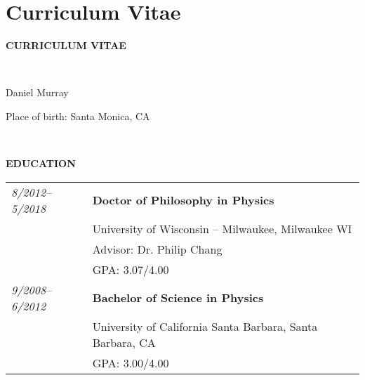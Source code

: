 \documentclass[12pt,notitlepage]{report}
\newcommand{\sglspc}{\setstretch{1.1}}
\begin{document}






%







\newpage
\section{Curriculum Vitae}
\sglspc
\begin{center}
{\bf \Large{CURRICULUM VITAE}}\\
\end{center}

\

Daniel Murray

Place of birth: Santa Monica, CA

\

\small{
\medskip\noindent
{\bfseries  EDUCATION}
\medskip

\begin{tabular}{ll}
{\it 8/2012--5/2018} & {\bf Doctor of Philosophy in Physics} \\
 			        & University of Wisconsin -- Milwaukee, Milwaukee WI \\
			        & Advisor: Dr. Philip Chang \\
			        & GPA: 3.07/4.00 \\
{\it 9/2008--6/2012} & {\bf Bachelor of Science in Physics} \\
 			        & University of California Santa Barbara, Santa Barbara, CA \\
			        & GPA: 3.00/4.00 \\
\end{tabular}
}
\end{document}

